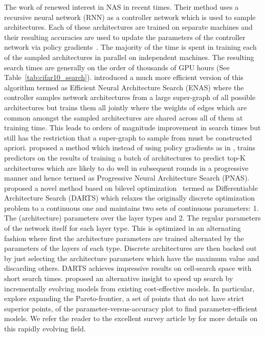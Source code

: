 The work of \citep{nas,NASCell} renewed interest in NAS in recent times. Their method uses a recursive neural network (RNN) as a controller network which is used to sample architectures. Each of these architectures are trained on separate machines and their resulting accuracies are used to update the parameters of the controller network via policy gradients~\citep{policygradient}. The majority of the time is spent in training each of the sampled architectures in parallel on independent machines. The resulting search times are generally on the order of thousands of GPU hours (See Table~\ref{tab:cifar10_search}). \cite{Pham2018EfficientNA} introduced a much more efficient version of this algorithm termed as Efficient Neural Architecture Search (ENAS) where the controller samples network architectures from a large super-graph of all possible architectures but trains them all jointly where the weights of edges which are common amongst the sampled architectures are shared across all of them at training time. This leads to orders of magnitude improvement in search times but still has the restriction that a super-graph to sample from must be constructed apriori.
\cite{Liu2017ProgressiveNA} proposed a method which instead of using policy gradients as in \cite{NASCell}, trains predictors on the results of training a batch of architectures to predict top-K architectures which are likely to do well in subsequent rounds in a progressive manner and hence termed as Progressive Neural Architecture Search (PNAS). 
\cite{Liu2018DARTSDA} proposed a novel method based on bilevel optimization~\citep{bilevel_opt} termed as Differentiable Architecture Search (DARTS) which relaxes the originally discrete optimization problem to a continuous one and maintains two sets of continuous parameters: 1. The (architecture) parameters over the layer types and 2. The regular parameters of the network itself for each layer type. This is optimized in an alternating fashion where first the architecture parameters are trained alternated by the parameters of the layers of each type. Discrete architectures are then backed out by just selecting the architecture parameters which have the maximum value and discarding others. DARTS achieves impressive results on cell-search space with short search times.
\cite{Elsken2018EfficientMN, CaiPathLevel} proposed an alternative insight to speed up search by incrementally evolving models from existing cost-effective models. In particular,~\cite{Elsken2018EfficientMN} explore expanding the Pareto-frontier, a set of points that do not have strict superior points, of the parameter-versus-accuracy plot to find parameter-efficient models. We refer the reader to the excellent survey article by \cite{Elsken2018NeuralAS} for more details on this rapidly evolving field. 


